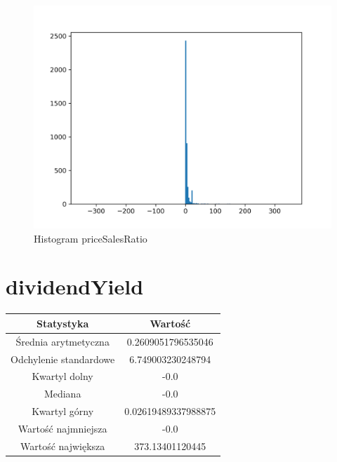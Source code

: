 \documentclass{article}
\begin{document}
\begin{figure}[h!]
    \includegraphics[width=\linewidth]{variables/priceSalesRatio.png}
    \caption{Histogram priceSalesRatio }
\end{figure}\section{ dividendYield }

\begin{center}
    \begin{tabular}{|c | c|} 
    \hline
    Statystyka & Wartość \\
    \hline\hline
    Średnia arytmetyczna & 0.2609051796535046 \\ 
    \hline
    Odchylenie standardowe & 6.749003230248794 \\
    \hline
    Kwartyl dolny & -0.0 \\
    \hline
    Mediana & -0.0 \\
    \hline
    Kwartyl górny & 0.02619489337988875 \\
    \hline
    Wartość najmniejsza & -0.0 \\
    \hline
    Wartość największa & 373.13401120445 \\
    \hline
   \end{tabular}
\end{center}
\end{document}

